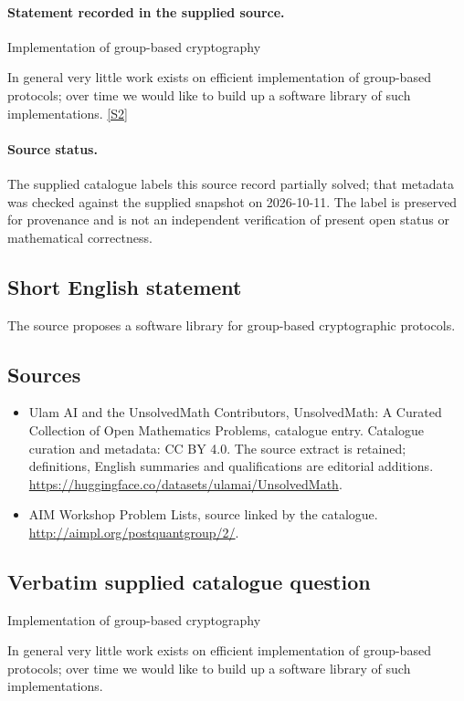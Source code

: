 \documentclass[11pt]{article}
\begin{document}
\paragraph{Statement recorded in the supplied source.}
Implementation of group-based cryptography

In general very little work exists on efficient implementation of group-based protocols; over time we would like to build up a software library of such implementations. \href{http://aimpl.org/postquantgroup/2/}{[S2]}
\paragraph{Source status.}
The supplied catalogue labels this source record partially solved; that metadata was checked against the supplied snapshot on 2026-10-11. The label is preserved for provenance and is not an independent verification of present open status or mathematical correctness.
\subsection{Short English statement}
The source proposes a software library for group-based cryptographic protocols.
\subsection{Sources}
\begin{itemize}
\item[S1] Ulam AI and the UnsolvedMath Contributors, UnsolvedMath: A Curated Collection of Open Mathematics Problems, catalogue entry. Catalogue curation and metadata: CC BY 4.0. The source extract is retained; definitions, English summaries and qualifications are editorial additions.
\url{https://huggingface.co/datasets/ulamai/UnsolvedMath}.
\item[S2] AIM Workshop Problem Lists, source linked by the catalogue.
\url{http://aimpl.org/postquantgroup/2/}.
\end{itemize}
\subsection{Verbatim supplied catalogue question}
Implementation of group-based cryptography

In general very little work exists on efficient implementation of group-based protocols; over time we would like to build up a software library of such implementations.
\end{document}
